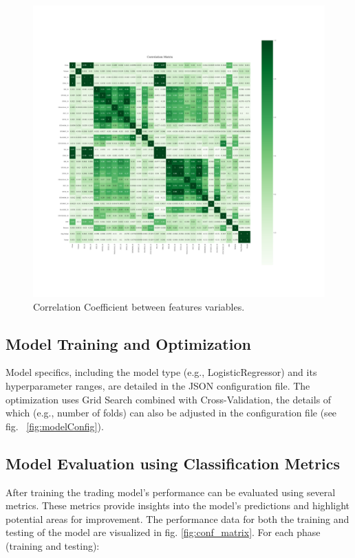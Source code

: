 \begin{figure}[H]
\centering
\begin{adjustbox}{max width=1.2\textwidth,center}
    \includegraphics[scale=1.2, trim={30mm 70mm 50mm 110mm}, clip]{./pdf/correlation_matrix.pdf}
\end{adjustbox}
\caption{Correlation Coefficient between features variables.}
\label{fig:corr_coef}
\end{figure}


\subsection{Model Training and Optimization}
Model specifics, including the model type (e.g., LogisticRegressor) and its hyperparameter ranges, are detailed in the JSON configuration file. The optimization uses Grid Search combined with Cross-Validation, the details of which (e.g., number of folds) can also be adjusted in the configuration file (see fig. ~\ref{fig:modelConfig}).

\subsection{Model Evaluation using Classification Metrics}
After training the trading model's performance can be evaluated using several metrics. These metrics provide insights into the model's predictions and highlight potential areas for improvement.
The performance data for both the training and testing of the model are visualized in fig. \ref{fig:conf_matrix}.
For each phase (training and testing):

